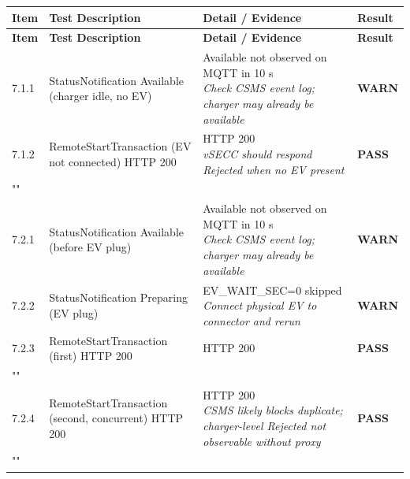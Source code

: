 \documentclass[10pt, a4paper]{article}
\begin{document}
\renewcommand{\arraystretch}{1.35}
\begin{longtable}{|L{1cm}|L{5.5cm}|M{7cm}|C{1.8cm}|}
\hline
{}
\textbf{Item} & \small\textbf{Test Description} & \small\textbf{Detail / Evidence} & \small\textbf{Result} \\
\hline
\endfirsthead
\hline
{}
\textbf{Item} & \small\textbf{Test Description} & \small\textbf{Detail / Evidence} & \small\textbf{Result} \\
\hline
\endhead
\hline
\endfoot
\small 7.1.1 & \small StatusNotification Available (charger idle, no EV) & Available not observed on MQTT in 10 s{\newline\normalfont\footnotesize\itshape Check CSMS event log; charger may already be available} & \textcolor{warnorange}{\textbf{WARN}} \\
\hline
\small 7.1.2 & \small RemoteStartTransaction (EV not connected)  HTTP 200 & HTTP 200{\newline\normalfont\footnotesize\itshape vSECC should respond Rejected when no EV present} & \textcolor{passgreen}{\textbf{PASS}} \\
\hline
{} \\
\hline
\small 7.2.1 & \small StatusNotification Available (before EV plug) & Available not observed on MQTT in 10 s{\newline\normalfont\footnotesize\itshape Check CSMS event log; charger may already be available} & \textcolor{warnorange}{\textbf{WARN}} \\
\hline
\small 7.2.2 & \small StatusNotification Preparing (EV plug) & EV\_WAIT\_SEC=0  skipped{\newline\normalfont\footnotesize\itshape Connect physical EV to connector and rerun} & \textcolor{warnorange}{\textbf{WARN}} \\
\hline
\small 7.2.3 & \small RemoteStartTransaction (first)  HTTP 200 & HTTP 200 & \textcolor{passgreen}{\textbf{PASS}} \\
\hline
{} \\
\hline
\small 7.2.4 & \small RemoteStartTransaction (second, concurrent)  HTTP 200 & HTTP 200{\newline\normalfont\footnotesize\itshape CSMS likely blocks duplicate; charger-level Rejected not observable without proxy} & \textcolor{passgreen}{\textbf{PASS}} \\
\hline
{} \\

\end{longtable}
\end{document}

